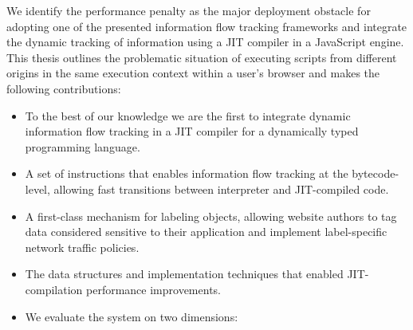 We identify the performance penalty as the major deployment obstacle for adopting one of the presented information flow tracking frameworks and integrate the dynamic tracking of information using a JIT compiler in a JavaScript engine.
This thesis outlines the problematic situation of executing scripts from different origins in the same execution context within a user's browser and makes the following contributions:

\begin{itemize}

\item{To the best of our knowledge we are the first to integrate dynamic information flow tracking in a JIT compiler for a dynamically typed programming language.}

\item{A set of instructions that enables information flow tracking at the bytecode-level, allowing fast transitions between interpreter and JIT-compiled code.}

\item{A first-class mechanism for labeling objects, allowing website authors to tag data considered sensitive to their application and implement label-specific network traffic policies.}

\item{The data structures and implementation techniques that enabled JIT-compilation performance improvements.}

\item{We evaluate the system on two dimensions:}


\end{itemize}

